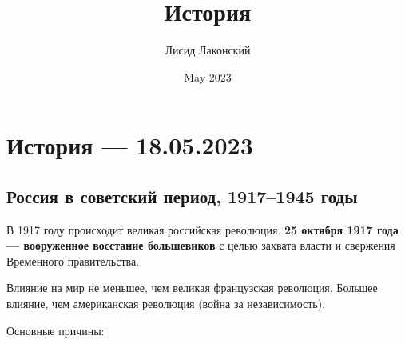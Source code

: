 \documentclass{article}
\title{История}
\author{Лисид Лаконский}
\date{May 2023}
\begin{document}
\raggedright

\maketitle
\tableofcontents
\pagebreak

\section{История — 18.05.2023}

\subsection{Россия в советский период, 1917–1945 годы}

В 1917 году происходит великая российская революция. \textbf{25 октября 1917 года — вооруженное восстание большевиков} с целью захвата власти и свержения Временного правительства.

Влияние на мир не меньшее, чем великая французская революция. Большее влияние, чем американская революция (война за независимость).

Основные причины:
\end{document}
